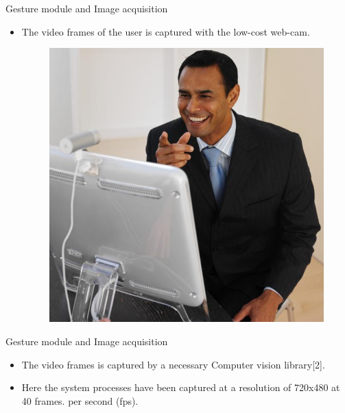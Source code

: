 \documentclass{beamer}
\begin{document}
\begin{frame}{Gesture module and Image acquisition}
 \begin{itemize}
\item The video frames of the user is captured with the low-cost web-cam.
\begin{figure}
\begin{center}
\includegraphics[scale=0.2]{images/webcam.jpg}
\end{center}
\end{figure}
\vspace{.5 cm}


\end{itemize}
\end{frame}

\begin{frame}{Gesture module and Image acquisition}
 \begin{itemize}
\item The video frames is captured by a necessary Computer vision library[2].


\vspace{.5 cm}

\item Here the system processes have been captured at a resolution of 720x480 at 40 frames.
per second (fps).
\end{itemize}
\end{frame}
\end{document}
